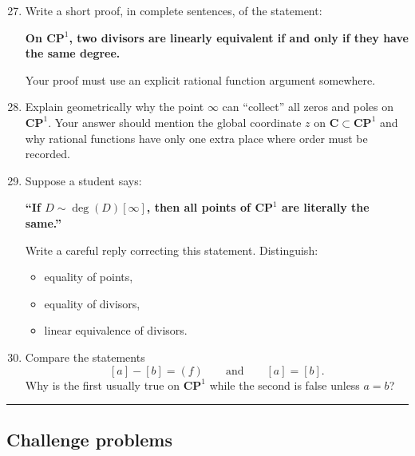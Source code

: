\documentclass[11pt,openany]{article}
\renewcommand{\emph}[1]{\textbf{#1}}
\begin{document}
\begin{enumerate}
	\setcounter{enumi}{26}
	
	\item Write a short proof, in complete sentences, of the statement:
	
	\medskip
	
	\emph{On \(\mathbf{CP}^1\), two divisors are linearly equivalent if and only if they have the same degree.}
	
	\medskip
	
	Your proof must use an explicit rational function argument somewhere.
	
	\item Explain geometrically why the point \(\infty\) can ``collect'' all zeros and poles on \(\mathbf{CP}^1\).  
	Your answer should mention the global coordinate \(z\) on \(\mathbf{C}\subset \mathbf{CP}^1\) and why rational functions have only one extra place where order must be recorded.
	
	\item Suppose a student says:
	
	\medskip
	
	\emph{``If \(D\sim \deg(D)[\infty]\), then all points of \(\mathbf{CP}^1\) are literally the same.''}
	
	\medskip
	
	Write a careful reply correcting this statement. Distinguish:
	\begin{itemize}
		\item equality of points,
		\item equality of divisors,
		\item linear equivalence of divisors.
	\end{itemize}
	
	\item Compare the statements
	\[
	[a]-[b]=(f)
	\qquad\text{and}\qquad
	[a]=[b].
	\]
	Why is the first usually true on \(\mathbf{CP}^1\) while the second is false unless \(a=b\)?
\end{enumerate}

\bigskip
\hrule
\bigskip

\subsection*{Challenge problems}
\end{document}
